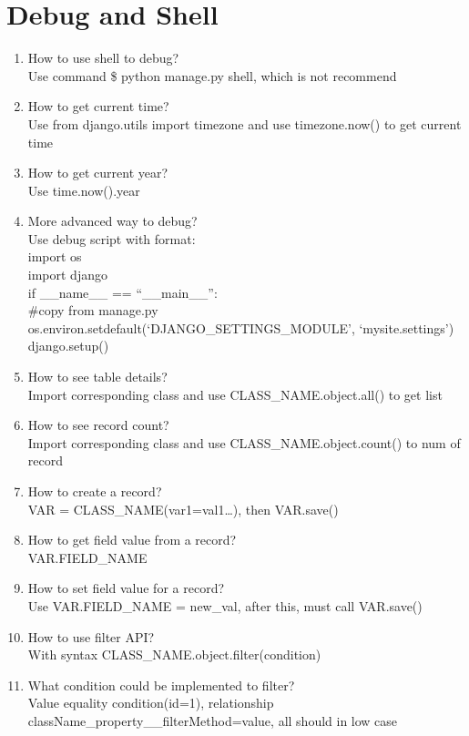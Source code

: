 \documentclass[10pt,a4paper,oneside]{article}
\begin{document}
\section{Debug and Shell}
\begin{enumerate}[1.]
\item How to use shell to debug?\\
Use command \$ python manage.py shell, which is not recommend
\item How to get current time?\\
Use from django.utils import timezone and use timezone.now() to get current time
\item How to get current year?\\
Use time.now().year
\item More advanced way to debug?\\
Use debug script with format: \\
import os\\
import django\\
if \_\_name\_\_ == ``\_\_main\_\_'':\\
\indent\quad\quad\#copy from manage.py\\
\indent\quad\quad os.environ.setdefault(`DJANGO\_SETTINGS\_MODULE', `mysite.settings') \\
\indent\quad\quad django.setup()
\item How to see table details?\\
Import corresponding class and use CLASS\_NAME.object.all() to get list
\item How to see record count?\\
Import corresponding class and use CLASS\_NAME.object.count() to num of record
\item How to create a record?\\
VAR = CLASS\_NAME(var1=val1\dots), then VAR.save()
\item How to get field value from a record?\\
VAR.FIELD\_NAME
\item How to set field value for a record?\\
Use VAR.FIELD\_NAME = new\_val, after this, must call VAR.save()
\item How to use filter API?\\
With syntax CLASS\_NAME.object.filter(condition)
\item What condition could be implemented to filter?\\
Value equality condition(id=1), relationship className\_property\_\_filterMethod=value, all should in low case
\end{enumerate}
\end{document}
